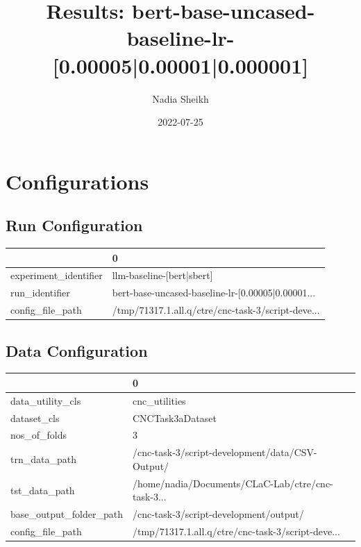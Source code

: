 \documentclass{article}
\title{Results: bert-base-uncased-baseline-lr-[0.00005|0.00001|0.000001]}
\author{Nadia Sheikh}
\date{2022-07-25}
\begin{document}
\maketitle
\section{Configurations}
\subsection{Run Configuration}
\begin{tabular}{ll}
\toprule
{} &                                                  0 \\
\midrule
experiment\_identifier &                          llm-baseline-[bert|sbert] \\
run\_identifier        &  bert-base-uncased-baseline-lr-[0.00005|0.00001... \\
config\_file\_path      &  /tmp/71317.1.all.q/ctre/cnc-task-3/script-deve... \\
\bottomrule
\end{tabular}

\subsection{Data Configuration}
\begin{tabular}{ll}
\toprule
{} &                                                  0 \\
\midrule
data\_utility\_cls        &                                      cnc\_utilities \\
dataset\_cls             &                                   CNCTask3aDataset \\
nos\_of\_folds            &                                                  3 \\
trn\_data\_path           &    /cnc-task-3/script-development/data/CSV-Output/ \\
tst\_data\_path           &  /home/nadia/Documents/CLaC-Lab/ctre/cnc-task-3... \\
base\_output\_folder\_path &             /cnc-task-3/script-development/output/ \\
config\_file\_path        &  /tmp/71317.1.all.q/ctre/cnc-task-3/script-deve... \\
\bottomrule
\end{tabular}
\end{document}
